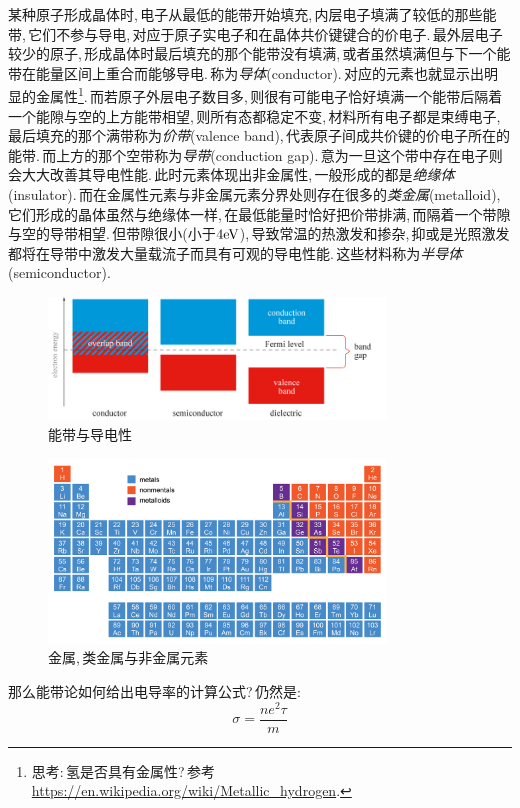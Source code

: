 某种原子形成晶体时,\,电子从最低的能带开始填充,\,内层电子填满了较低的那些能带,\,它们不参与导电,\,对应于原子实电子和在晶体共价键键合的价电子.\,最外层电子较少的原子,\,形成晶体时最后填充的那个能带没有填满,\,或者虽然填满但与下一个能带在能量区间上重合而能够导电.\,称为\emph{导体}(conductor).\,对应的元素也就显示出明显的金属性\footnote{思考:\,氢是否具有金属性?\,参考\url{https://en.wikipedia.org/wiki/Metallic_hydrogen}.}.\,而若原子外层电子数目多,\,则很有可能电子恰好填满一个能带后隔着一个能隙与空的上方能带相望,\,则所有态都稳定不变,\,材料所有电子都是束缚电子,\,最后填充的那个满带称为\emph{价带}(valence band),\,代表原子间成共价键的价电子所在的能带.\,而上方的那个空带称为\emph{导带}(conduction gap).\,意为一旦这个带中存在电子则会大大改善其导电性能.\,此时元素体现出非金属性,\,一般形成的都是\emph{绝缘体}(insulator).\,而在金属性元素与非金属元素分界处则存在很多的\emph{类金属}(metalloid),\,它们形成的晶体虽然与绝缘体一样,\,在最低能量时恰好把价带排满,\,而隔着一个带隙与空的导带相望.\,但带隙很小(小于$4{\rm eV}$),\,导致常温的热激发和掺杂,\,抑或是光照激发都将在导带中激发大量载流子而具有可观的导电性能.\,这些材料称为\emph{半导体}(semiconductor).
\begin{figure}[H]
\centering
\includegraphics[width=0.8\textwidth]{image/7-3-3.jpg}
\caption{能带与导电性}
\end{figure}
\begin{figure}[H]
\centering
\includegraphics[width=0.8\textwidth]{image/7-3-4.jpg}
\caption{金属,\,类金属与非金属元素}
\end{figure}

那么能带论如何给出电导率的计算公式?\,仍然是:
\[\sigma=\frac{ne^2 \tau}{m}\]

